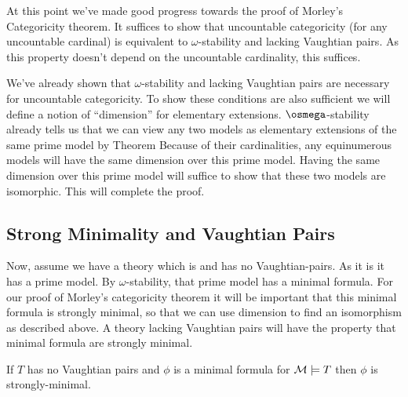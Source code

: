 At this point we've made good progress towards the proof of Morley's Categoricity theorem.
It suffices to show that uncountable categoricity (for any uncountable cardinal) is equivalent to \(\omega\)-stability and lacking Vaughtian pairs.
As this property doesn't depend on the uncountable cardinality, this suffices. 

We've already shown that \(\omega\)-stability and lacking Vaughtian pairs are necessary for uncountable categoricity.
To show these conditions are also sufficient we will define a notion of ``dimension'' for elementary extensions.
\(\osmega\)-stability already tells us that we can view any two models as elementary extensions of the same prime model by Theorem %
Because of their cardinalities, any equinumerous models will have the same dimension over this prime model.
Having the same dimension over this prime model will suffice to show that these two models are isomorphic.
This will complete the proof. 

\subsection{Strong Minimality and Vaughtian Pairs}

Now, assume we have a theory which is \omst and has no Vaughtian-pairs. 
As it is \omst it has a prime model.
By \(\omega\)-stability, that prime model has a minimal formula. 
For our proof of Morley's categoricity theorem it will be important that this minimal formula is strongly minimal, so that we can use dimension to find an isomorphism as described above. 
A theory lacking Vaughtian pairs will have the property that minimal formula are strongly minimal. 

\begin{theorem}\label{theorem_minimal_vaughtian_pair}
If \(T\) has no Vaughtian pairs and \(\phi\) is a minimal formula for \(\mathcal{M} \models T\) then \(\phi\) is strongly-minimal. 
\end{theorem}

